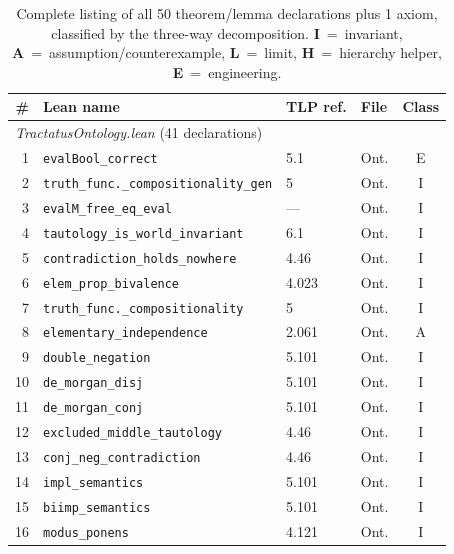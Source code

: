 \documentclass[10pt, letterpaper]{article}
\theoremstyle{definition}
\theoremstyle{remark}
\begin{document}
\begin{table}[p]
\centering
\scriptsize
\caption{Complete listing of all 50 theorem/lemma declarations
  plus 1 axiom, classified by the three-way decomposition.
  \textbf{I}~=~invariant, \textbf{A}~=~assumption/counterexample,
  \textbf{L}~=~limit, \textbf{H}~=~hierarchy helper,
  \textbf{E}~=~engineering.}
\label{tab:decomposition}
\begin{tabular}{@{}rlllc@{}}
\toprule
\# & \textbf{Lean name} & \textbf{TLP ref.} & \textbf{File} & \textbf{Class} \\
\midrule
\multicolumn{5}{l}{\emph{TractatusOntology.lean} (41 declarations)} \\
\midrule
 1 & \texttt{evalBool\_correct}                        & 5.1     & Ont. & E \\
 2 & \texttt{truth\_func.\_compositionality\_gen}       & 5       & Ont. & I \\
 3 & \texttt{evalM\_free\_eq\_eval}                     & ---     & Ont. & I \\
 4 & \texttt{tautology\_is\_world\_invariant}            & 6.1     & Ont. & I \\
 5 & \texttt{contradiction\_holds\_nowhere}              & 4.46    & Ont. & I \\
 6 & \texttt{elem\_prop\_bivalence}                      & 4.023   & Ont. & I \\
 7 & \texttt{truth\_func.\_compositionality}             & 5       & Ont. & I \\
 8 & \texttt{elementary\_independence}                   & 2.061   & Ont. & A \\
 9 & \texttt{double\_negation}                           & 5.101   & Ont. & I \\
10 & \texttt{de\_morgan\_disj}                           & 5.101   & Ont. & I \\
11 & \texttt{de\_morgan\_conj}                           & 5.101   & Ont. & I \\
12 & \texttt{excluded\_middle\_tautology}                & 4.46    & Ont. & I \\
13 & \texttt{conj\_neg\_contradiction}                   & 4.46    & Ont. & I \\
14 & \texttt{impl\_semantics}                            & 5.101   & Ont. & I \\
15 & \texttt{biimp\_semantics}                           & 5.101   & Ont. & I \\
16 & \texttt{modus\_ponens}                              & 4.121   & Ont. & I \\

\end{tabular}
\end{table}
\end{document}
